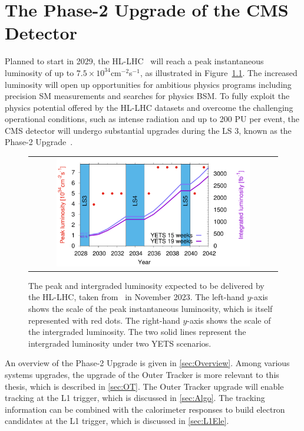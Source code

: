 \chapter{The Phase-2 Upgrade of the CMS Detector}
\label{chap:Upgrade}

Planned to start in 2029, the \ac{HL-LHC}~\cite{Apollinari:2017lan} will reach a peak instantaneous luminosity of up to $7.5\times10^{34}$cm$^{-2}$s$^{-1}$, as illustrated in Figure~\ref{fig:Lumi}. The increased luminosity will open up opportunities for ambitious physics programs including precision \ac{SM} measurements and searches for physics \ac{BSM}. To fully exploit the physics potential offered by the \ac{HL-LHC} datasets and overcome the challenging operational conditions, such as intense radiation and up to 200 \ac{PU} per event, the \ac{CMS} detector will undergo substantial upgrades during the \ac{LS} 3, known as the Phase-2 Upgrade~\cite{Contardo:2015bmq}.  

\begin{figure}[tbh!]
 \begin{center}
 \begin{tabular}{c}
 \includegraphics[width=0.8\textwidth]{figures/Part2/Upgrade/Lumi}
 \end{tabular}
 \caption{The peak and intergraded luminosity expected to be delivered by the \ac{HL-LHC}, taken from~\cite{LHC:plan} in November 2023. The left-hand $y$-axis shows the scale of the peak instantaneous luminosity, which is itself represented with red dots. The right-hand $y$-axis shows the scale of the intergraded luminosity. The two solid lines represent the intergraded luminosity under two \ac{YETS} scenarios.}
 \label{fig:Lumi}
 \end{center}
\end{figure}

An overview of the Phase-2 Upgrade is given in \autoref{sec:Overview}. Among various systems upgrades, the upgrade of the Outer Tracker is more relevant to this thesis, which is described in \autoref{sec:OT}. The Outer Tracker upgrade will enable tracking at the \ac{L1} trigger, which is discussed in \autoref{sec:Algo}. The tracking information can be combined with the calorimeter responses to build electron candidates at the \ac{L1} trigger, which is discussed in \autoref{sec:L1Ele}.

